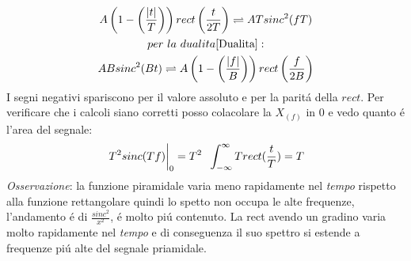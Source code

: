 {\begin{itemize}
{                    \begin{gather}
                        A\left(1-\left(\frac{|t|}{T}\right)\right)rect \left(\frac{t}{2T}\right) \rightleftharpoons ATsinc^2(fT)\nonumber\\
                        per\ la\ dualita \ref{Dualita}: \nonumber \\
                        ABsinc^2(Bt) \rightleftharpoons A\left(1-\left(\frac{|f|}{B}\right)\right)rect \left(\frac{f}{2B}\right) \nonumber
                    \end{gather} 
                    I segni negativi spariscono per il valore assoluto e per la paritá della $rect$. Per verificare che i calcoli siano
                    corretti posso colacolare la $X_{(f)}$ in $0$ e vedo quanto é l'area del segnale: 
                    \[
                        \eval{T^2sinc(Tf)}_{0} = T^2 \hspace{.2cm} \int_{-\infty}^{\infty} Trect(\frac{t}{T}) = T  
                    \]
                    {\em Osservazione}: la funzione piramidale varia meno rapidamente nel {\em tempo} rispetto alla funzione rettangolare
                    quindi lo spetto non occupa le alte frequenze, l'andamento é di $\frac{sinc^2}{x^2}$, é molto piú contenuto. La rect avendo un gradino
                    varia molto rapidamente nel {\em tempo} e di conseguenza il suo spettro si estende a frequenze piú alte del segnale priamidale.
                    \begin{figure}[H]
                        \centering
\end{figure}}
\end{itemize}}
